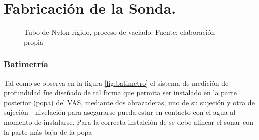 \hfill\section{Fabricaci\'on de la Sonda.}
\begin{figure}[t]
\centering
{}
\caption{Tubo de Nylon r\'igido, proceso de vaciado. Fuente: elaboración propia}
\label{fig:preparacion}
\end{figure}

\subsubsection[batimetría]{Batimetr\'ia} 
Tal como se observa en la figura \ref{fig:batimetro} el sistema de medici\'on de profundidad fue dise\~nado de tal forma que permita ser instalado en la parte posterior (popa) del VAS, mediante dos abrazaderas, uno de su sujeci\'on y otra de sujeci\'on - nivelaci\'on para asegurarse  pueda estar en contacto con el agua al momento de instalarse.  Para la correcta  instalci\'on de se debe alinear el sonar con la parte m\'as baja de la popa 

